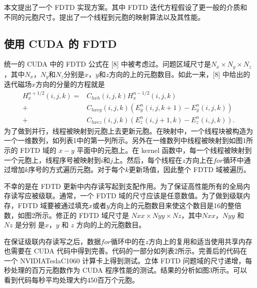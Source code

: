 本文提出了一个 FDTD 实现方案。其中 FDTD 迭代方程假设了更一般的介质和不同的元胞尺寸。提出了一个线程到元胞的映射算法以及其性能。

\subsection{使用 CUDA 的 FDTD}

统一的 CUDA 中的 FDTD 公式在 [8] 中被考虑过。问题区域尺寸是$N_x\times N_y \times N_z$，其中$N_x$，$N_y$和$N_z$分别是$x$，$y$和$z$方向的上的元胞数目。如此一来，[8] 中给出的迭代磁场$x$方向的分量的方程就是
\begin{equation}
\begin{split}
H_{x}^{n+1/2}(i,j,k) =& C_{hxh}(i,j,k)H_{x}^{n-1/2}(i,j,k)\\
+ & C_{hxey}(i,j,k)(E_{y}^{n}(i,j,k+1)-E_{y}^{n}(i,j,k))\\
+ & C_{hxez}(i,j,k)(E_{z}^{n}(i,j+1,k)-E_{z}^{n}(i,j,k)).
\end{split}
\end{equation}
为了做到并行，线程被映射到元胞上去更新元胞。在映射中，一个线程块被构造为一个一维数列，如列表1中的第一列所示。另外在一维数列中线程被映射到如图1所示的 FDTD 域的 $x-y$ 平面中的元胞上。在 kernel 函数中，每一个线程被映射到一个元胞上，线程序号被映射到$i$和$j$上。然后，每个线程在$z$方向上在$for$循环中通过增加$k$序号的方式遍历元胞。对于每个$k$更新场值，因此整个 FDTD 域被遍历。

不幸的是在 FDTD 更新中内存读写起到支配作用。为了保证高性能所有的全局内存读写应被级联。通常，一个 FDTD 域的尺寸应该是任意数值。为了做到级联内存，FDTD 域要被通过填充$x$或者$y$方向上的元胞数目来使这个数目是16的整倍数，如图2所示。修正的 FDTD 域尺寸是 $Nxx\times Nyy\times Nz$，其中$Nxx$，$Nyy$ 和 $Nz$ 是分别 是$x$，$y$ 和 $z$ 方向的上的元胞数目。

在保证级联内存读写之后，数据$for$循环中的在$z$方向上的复用和适当使用共享内存也需要在 CUDA 代码中得到完善。代码的一部分如列表2所示。完善后的代码在一个 NVIDIA\textregistered Tesla\texttrademark C1060 计算卡上得到测试。立体 FDTD 问题域的尺寸递增，每秒处理的百万元胞数作为 CUDA 程序性能的测试。结果的分析如图3所示。可以看到代码每秒平均处理大约450百万个元胞。